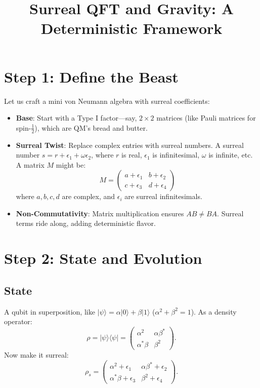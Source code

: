 \documentclass{article}
\begin{document}
\title{Surreal QFT and Gravity: A Deterministic Framework}
\author{}
\date{}
\maketitle

\section{Step 1: Define the Beast}
Let us craft a mini von Neumann algebra with surreal coefficients:
\begin{itemize}
\item \textbf{Base}: Start with a Type I factor---say, \(2 \times 2\) matrices (like Pauli matrices for spin-\(\tfrac{1}{2}\)), which are QM's bread and butter.
\item \textbf{Surreal Twist}: Replace complex entries with surreal numbers. A surreal number \(s = r + \epsilon_1 + \omega \epsilon_2\), where \(r\) is real, \(\epsilon_1\) is infinitesimal, \(\omega\) is infinite, etc. A matrix \(M\) might be:
\[
M = 
\begin{pmatrix}
a + \epsilon_1 & b + \epsilon_2 \\
c + \epsilon_3 & d + \epsilon_4
\end{pmatrix}
\]
where \(a, b, c, d\) are complex, and \(\epsilon_i\) are surreal infinitesimals.
\item \textbf{Non-Commutativity}: Matrix multiplication ensures \(AB \neq BA\). Surreal terms ride along, adding deterministic flavor.
\end{itemize}

\section{Step 2: State and Evolution}
\subsection{State}
A qubit in superposition, like \(\vert \psi \rangle = \alpha\vert 0 \rangle + \beta\vert 1 \rangle\) (\(\alpha^2 + \beta^2 = 1\)). As a density operator:
\[
\rho = \vert \psi \rangle \langle \psi \vert = 
\begin{pmatrix}
\alpha^2 & \alpha \beta^* \\
\alpha^* \beta & \beta^2
\end{pmatrix}.
\]
Now make it surreal:
\[
\rho_s = 
\begin{pmatrix}
\alpha^2 + \epsilon_1 & \alpha \beta^* + \epsilon_2 \\
\alpha^* \beta + \epsilon_3 & \beta^2 + \epsilon_4
\end{pmatrix}.
\]
\end{document}
